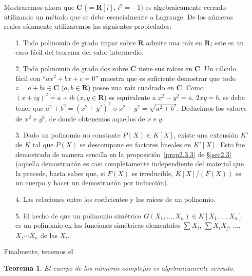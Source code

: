 \documentclass[10pt,oneside,bibtotoc,smallheadings,leqno,a5paper,DIV=12]{scrbook}
\newcommand{\RR}{\mathbf{R}}
\newcommand{\CC}{\mathbf{C}}
\numberwithin{equation}{section}
\theoremstyle{defi}
\theoremstyle{enonce}
\newtheorem*{theorem*}{Teorema}
\theoremstyle{rem}
\numberwithin{theorem}{section}
\numberwithin{proposition}{section}
\numberwithin{definition}{section}
\numberwithin{lemma}{section}
\numberwithin{corollary}{section}
\numberwithin{example}{section}
\numberwithin{footnote}{section}%
\begin{document}
Mostraremos ahora que $\CC$ ($=\RR[i]$, $i^{2}=-1$) es algebraicamente cerrado utilizando un m\'etodo
que se debe esencialmente a Lagrange. De los n\'umeros reales s\'olamente utilizaremos
las siguientes propiedades:
\begin{enumerate}
\item[1.] Todo polinomio de grado impar sobre $\RR$ admite una ra\'iz en $\RR$; este es un caso f\'acil del teorema
del valor intermedio.
\item[2.] Todo polinomio de grado dos sobre $\CC$ tiene sus ra\'ices en $\CC$. Un c\'alculo f\'acil con
``$ax^{2}+bx+c=0$'' muestra que es suficiente demostrar que todo $z=a+bi\in\CC$ ($a,b\in\RR$) posee una
ra\'iz cuadrado en $\CC$. Como $(x+iy)^{2}=a+ib$ ($x,y\in\RR$) es equivalente a $x^{2}-y^{2}=a$,
$2xy = b$, se debe tener que $a^{2}+b^{2}=(x^{2}+y^{2})^{2}$ o $x^{2}+y^{2} = \sqrt{a^{2}+b^{2}}$. Deducimos
los valores de $x^{2}$ e $y^{2}$, de donde obtenemos aquellos de $x$ e $y$.
\item[3.] Dado un polinomio no constante $P(X)\in K[X]$, existe una extensi\'on $K'$ de $K$ tal que
$P(X)$ se descompone en factores lineales en $K'[X]$. Esto fue demostrado de manera sencilla en la
proposici\'on~\ref{prop2.3.3} de \S\ref{sec2.3} (aquella demostraci\'on es casi completamente independiente del material que la precede,
basta saber que, si $F(X)$ es irreducible, $K[X]/(F(X))$ es un cuerpo y hacer un demostraci\'on por inducci\'on).
\item[4.] Las relaciones entre los coeficientes y las ra\'ices de un polinomio.
\item[5.] El hecho de que un polinomio sim\'etrico $G(X_{1},\dots,X_{n})\in K[X_{1},\dots,X_{n}]$ es un polinomio
en las funciones sim\'etricas elementales $\sum X_{i}$, $\sum X_{i}X_{j}$, ..., $X_{1}\cdots X_{n}$ de las
$X_{i}$.
\end{enumerate}

Finalmente, tenemos el

\begin{theorem*}
El cuerpo de los n\'umeros complejos es algebraicamente cerrado.
\end{theorem*}
\end{document}
